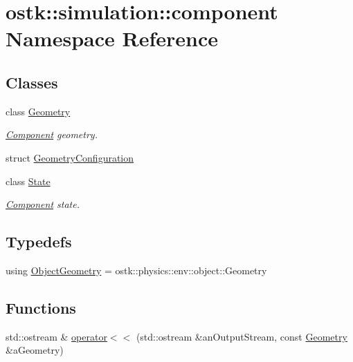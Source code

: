 \hypertarget{namespaceostk_1_1simulation_1_1component}{}\section{ostk\+:\+:simulation\+:\+:component Namespace Reference}
\label{namespaceostk_1_1simulation_1_1component}
\subsection*{Classes}
\begin{DoxyCompactItemize}
\item 
class \hyperlink{classostk_1_1simulation_1_1component_1_1_geometry}{Geometry}
\begin{DoxyCompactList}\small\item\em \hyperlink{classostk_1_1simulation_1_1_component}{Component} geometry. \end{DoxyCompactList}\item 
struct \hyperlink{structostk_1_1simulation_1_1component_1_1_geometry_configuration}{Geometry\+Configuration}
\item 
class \hyperlink{classostk_1_1simulation_1_1component_1_1_state}{State}
\begin{DoxyCompactList}\small\item\em \hyperlink{classostk_1_1simulation_1_1_component}{Component} state. \end{DoxyCompactList}\end{DoxyCompactItemize}
\subsection*{Typedefs}
\begin{DoxyCompactItemize}
\item 
using \hyperlink{namespaceostk_1_1simulation_1_1component_a911837ab7e6f8471e9927a74795a0077}{Object\+Geometry} = ostk\+::physics\+::env\+::object\+::\+Geometry
\end{DoxyCompactItemize}
\subsection*{Functions}
\begin{DoxyCompactItemize}
\item 
std\+::ostream \& \hyperlink{namespaceostk_1_1simulation_1_1component_a42b6057a6dd3cbb9a748c1d583ec31aa}{operator$<$$<$} (std\+::ostream \&an\+Output\+Stream, const \hyperlink{classostk_1_1simulation_1_1component_1_1_geometry}{Geometry} \&a\+Geometry)
\end{DoxyCompactItemize}



